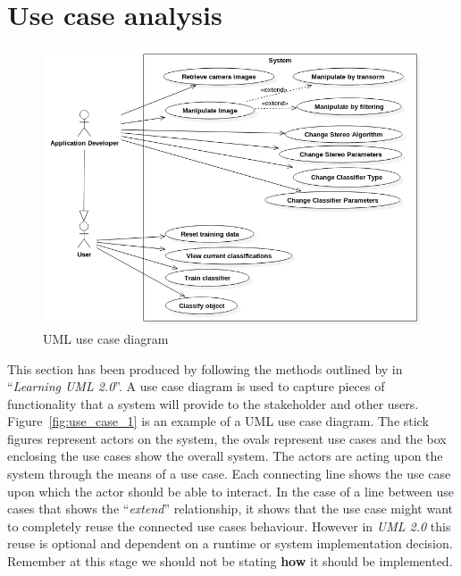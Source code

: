 \documentclass[11pt,oneside]{report}
\begin{document}
		\section{Use case analysis}
			\begin{figure}[ht]
			\begin{center}
    			\includegraphics[scale=0.45]{use_case_1}
    			\caption{UML use case diagram \protect {\label{fig:use_case_1}}}
    		\end{center}
			\end{figure}	
			This section has been produced by following the methods outlined by  in ``\textit{Learning UML 2.0}''.
			A use case diagram is used to capture pieces of functionality that a system will provide to the stakeholder and other users.
			Figure~\ref{fig:use_case_1} is an example of a UML use case diagram.
			The stick figures represent actors on the system, the ovals represent use cases and the box enclosing the use cases show the overall system. 
			The actors are acting upon the system through the means of a use case.
			Each connecting line shows the use case upon which the actor should be able to interact.
			In the case of a line between use cases that shows the ``\textit{extend}'' relationship, it shows that the use case might want to completely reuse the connected use cases behaviour.
			However in \textit{UML 2.0} this reuse is optional and dependent on a runtime or system implementation decision.
			Remember at this stage we should not be stating \textbf{how} it should be implemented.
			
			
			
			
			
			
			
			
		\clearpage
\end{document}
